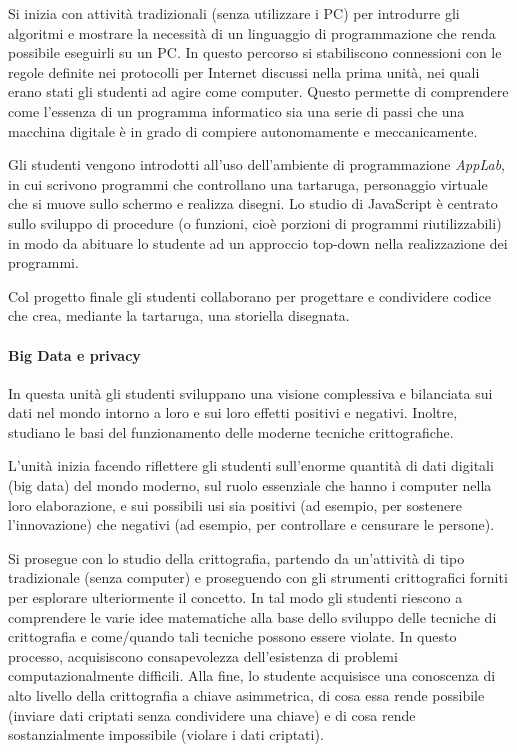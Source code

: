 \documentclass[11pt,a4paper]{article}
\begin{document}
Si inizia con attività tradizionali (senza utilizzare i PC) per
introdurre gli algoritmi e mostrare la necessità di un linguaggio di
programmazione che renda possibile eseguirli su un PC. In questo
percorso si stabiliscono connessioni con le regole definite nei
protocolli per Internet discussi nella prima unità, nei quali erano
stati gli studenti ad agire come computer. Questo permette di
comprendere come l'essenza di un programma informatico sia una serie
di passi che una macchina digitale è in grado di compiere
autonomamente e meccanicamente.

Gli studenti vengono introdotti all'uso dell'ambiente di
programmazione \emph{AppLab}, in cui scrivono programmi che
controllano una tartaruga, personaggio virtuale che si muove sullo
schermo e realizza disegni. Lo studio di JavaScript è centrato sullo
sviluppo di procedure (o funzioni, cioè porzioni di programmi
riutilizzabili) in modo da abituare lo studente ad un approccio
top-down nella realizzazione dei programmi.

Col progetto finale gli studenti collaborano per progettare e
condividere codice che crea, mediante la tartaruga, una storiella
disegnata.

\paragraph{Big Data e privacy}

In questa unità gli studenti sviluppano una visione complessiva e
bilanciata sui dati nel mondo intorno a loro e sui loro effetti
positivi e negativi. Inoltre, studiano le basi del funzionamento delle
moderne tecniche crittografiche.

L'unità inizia facendo riflettere gli studenti sull'enorme quantità di
dati digitali (big data) del mondo moderno, sul ruolo essenziale che
hanno i computer nella loro elaborazione, e sui possibili usi sia
positivi (ad esempio, per sostenere l'innovazione) che negativi (ad
esempio, per controllare e censurare le persone).

Si prosegue con lo studio della crittografia, partendo da un'attività
di tipo tradizionale (senza computer) e proseguendo con gli strumenti
crittografici forniti per esplorare ulteriormente il concetto. In tal
modo gli studenti riescono a comprendere le varie idee matematiche
alla base dello sviluppo delle tecniche di crittografia e come/quando
tali tecniche possono essere violate. In questo processo, acquisiscono
consapevolezza dell'esistenza di problemi computazionalmente
difficili. Alla fine, lo studente acquisisce una conoscenza di alto
livello della crittografia a chiave asimmetrica, di cosa essa rende
possibile (inviare dati criptati senza condividere una chiave) e di
cosa rende sostanzialmente impossibile (violare i dati criptati).
\end{document}

